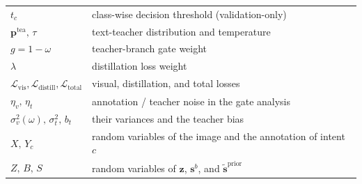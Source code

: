 \begin{table}[H]
\begin{tabular}{ll}
$t_c$ & class-wise decision threshold (validation-only) \\
$\mathbf{p}^{\text{tea}},\,\tau$ & text-teacher distribution and temperature \\
$g=1-\omega$ & teacher-branch gate weight \\
$\lambda$ & distillation loss weight \\
$\mathcal{L}_{\text{vis}},\mathcal{L}_{\text{distill}},\mathcal{L}_{\text{total}}$ & visual, distillation, and total losses \\
$\eta_v,\,\eta_t$ & annotation / teacher noise in the gate analysis \\
$\sigma_v^2(\omega),\,\sigma_t^2,\,b_t$ & their variances and the teacher bias \\
$X,\,Y_c$ & random variables of the image and the annotation of intent $c$ \\
$Z,\,B,\,S$ & random variables of $\mathbf{z}$, $\mathbf{s}^{b}$, and $\tilde{\mathbf{s}}^{\text{prior}}$ \\
\hline
\end{tabular}

\end{table}
\fi
